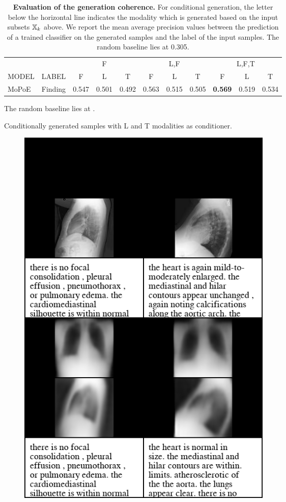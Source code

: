     \begin{frame}
        \begin{table}[]
            \centering
            \begin{tabular}{lcccccccccc}

                & & \multicolumn{3}{c}{F} & \multicolumn{3}{c}{L,F} & \multicolumn{3}{c}{L,F,T} \\  \cmidrule(l){3-5} \cmidrule(l){6-8} \cmidrule(l){9-11} MODEL & LABEL & F & L & T & F & L & T & F & L & T \\\midrule
                MoPoE & Finding & 0.547 & 0.501 & 0.492 & 0.563 & 0.515 & 0.505 & \textbf{0.569} & 0.519 & 0.534
            \end{tabular}
            \caption{\small{\textbf{Evaluation of the generation coherence.} For conditional generation, the letter below the horizontal line indicates the modality which is generated based on the input subsets $\mathbb{X} _k$ above. We report the mean average precision values between the prediction of a trained classifier on the generated samples and the label of the input samples. The random baseline lies at 0.305.}}
        \end{table}
        \pause
        The random baseline lies at .

    \end{frame}

    \begin{frame}{Conditionally generated samples with L and T modalities as conditioner.}

        \begin{figure}
            \centering
            \includegraphics[width=0.6\textwidth, height = 0.85\textheight, keepaspectratio]{slides/cond_gen/Lateral_text_blacked.png}

        \end{figure}
    \end{frame}

